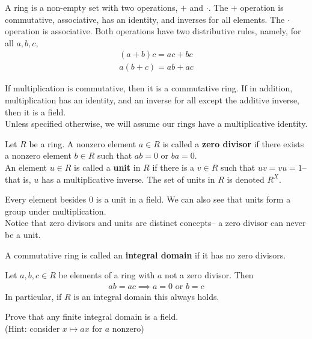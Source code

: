 \documentclass{memoir}
\begin{document}
\begin{defn}[Rings]
	A ring is a non-empty set with two operations, \(+\) and \(\cdot \). The \(+\) operation is commutative, associative, has an identity, and inverses for all elements. The \(\cdot \) operation is associative. Both operations have two distributive rules, namely, for all \(a,b,c\),
	\begin{align*}
		(a+b)c = ac + bc\\
		a(b+c) = ab+ac 
	\end{align*}
\end{defn}
If multiplication is commutative, then it is a commutative ring. If in addition, multiplication has an identity, and an inverse for all except the additive inverse, then it is a field.\\

Unless specified otherwise, we will assume our rings have a multiplicative identity.
\begin{defn}
	Let \(R\) be a ring. A nonzero element \(a \in R\) is called a \textbf{zero divisor} if there exists a nonzero element \(b \in R\) such that \(ab=0\) or \(ba=0\).\\

	An element \(u \in R\) is called a \textbf{unit} in \(R\) if there is a \(v \in R\) such that \(uv = vu = 1\)-- that is, \(u\) has a multiplicative inverse. The set of units in \(R\) is denoted \(R^{X}\).
\end{defn}
Every element besides \(0\) is a unit in a field. We can also see that units form a group under multiplication.\\

Notice that zero divisors and units are distinct concepts-- a zero divisor can never be a unit.

\begin{defn}
	A commutative ring is called an \textbf{integral domain} if it has no zero divisors.
\end{defn}

\begin{prop}
	Let \(a,b,c \in R\) be elements of a ring with \(a\) not a zero divisor. Then
	\begin{align*}
		ab = ac \implies a=0\text{ or } b = c
	\end{align*}
	In particular, if \(R\) is an integral domain this always holds.
\end{prop}

\begin{hw}
	Prove that any finite integral domain is a field.\\
	(Hint: consider \(x\mapsto ax\) for \(a\) nonzero)
\end{hw}
\end{document}
